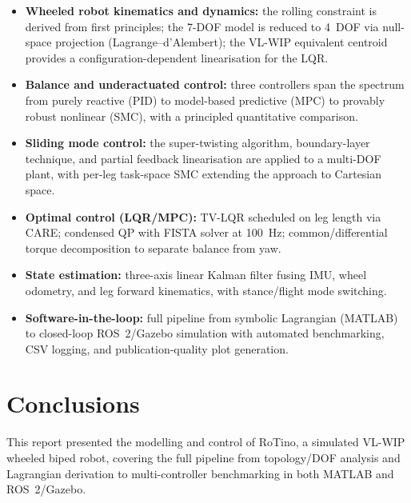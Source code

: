 \documentclass[11pt,a4paper]{article}
\begin{document}
\begin{itemize}[leftmargin=*]
    \item \textbf{Wheeled robot kinematics and dynamics:} the rolling constraint is derived
          from first principles; the 7-DOF model is reduced to 4~DOF via null-space
          projection (Lagrange--d'Alembert); the VL-WIP equivalent centroid provides a
          configuration-dependent linearisation for the LQR.
    \item \textbf{Balance and underactuated control:} three controllers span the spectrum
          from purely reactive (PID) to model-based predictive (MPC) to provably robust
          nonlinear (SMC), with a principled quantitative comparison.
    \item \textbf{Sliding mode control:} the super-twisting algorithm, boundary-layer
          technique, and partial feedback linearisation are applied to a multi-DOF plant,
          with per-leg task-space SMC extending the approach to Cartesian space.
    \item \textbf{Optimal control (LQR/MPC):} TV-LQR scheduled on leg length via CARE;
          condensed QP with FISTA solver at 100~Hz; common/differential torque decomposition
          to separate balance from yaw.
    \item \textbf{State estimation:} three-axis linear Kalman filter fusing IMU, wheel
          odometry, and leg forward kinematics, with stance/flight mode switching.
    \item \textbf{Software-in-the-loop:} full pipeline from symbolic Lagrangian (MATLAB) to
          closed-loop ROS~2/Gazebo simulation with automated benchmarking, CSV logging, and
          publication-quality plot generation.
\end{itemize}


\section{Conclusions}
\label{sec:conclusions}

This report presented the modelling and control of RoTino, a simulated VL-WIP wheeled biped
robot, covering the full pipeline from topology/DOF analysis and Lagrangian derivation to
multi-controller benchmarking in both MATLAB and ROS~2/Gazebo.
\end{document}

